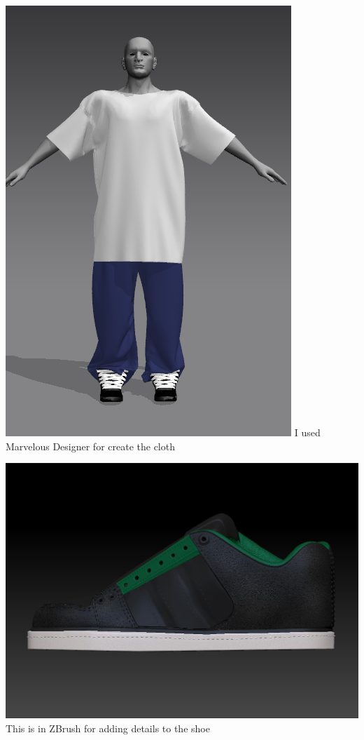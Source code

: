 \documentclass{article}
\begin{document}
  \includegraphics[width=\textwidth]{3.png}
  I used Marvelous Designer for create the cloth

  \includegraphics[width=\textwidth]{5.jpg}
  This is in ZBrush for adding details to the shoe
\end{document}
